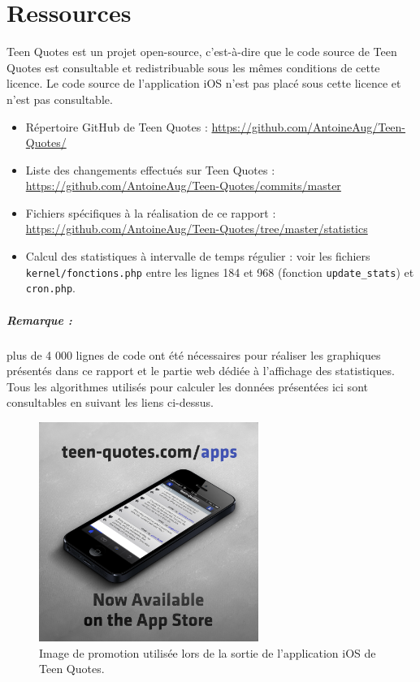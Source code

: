 \documentclass{report}
\begin{document}
	\chapter{Ressources}
	Teen Quotes est un projet open-source, c'est-à-dire que le code source de Teen Quotes est consultable et redistribuable sous les mêmes conditions de cette licence. Le code source de l'application iOS n'est pas placé sous cette licence et n'est pas consultable.\\

	\begin{itemize}
		\item Répertoire GitHub de Teen Quotes : \url{https://github.com/AntoineAug/Teen-Quotes/}
		\item Liste des changements effectués sur Teen Quotes : \url{https://github.com/AntoineAug/Teen-Quotes/commits/master}
		\item Fichiers spécifiques à la réalisation de ce rapport : \url{https://github.com/AntoineAug/Teen-Quotes/tree/master/statistics}
		\item Calcul des statistiques à intervalle de temps régulier : voir les fichiers \texttt{kernel/fonctions.php} entre les lignes 184 et 968 (fonction \texttt{update\_stats}) et \texttt{cron.php}.
	\end{itemize}

	\paragraph{Remarque :} plus de 4 000 lignes de code ont été nécessaires pour réaliser les graphiques présentés dans ce rapport et le partie web dédiée à l'affichage des statistiques. Tous les algorithmes utilisés pour calculer les données présentées ici sont consultables en suivant les liens ci-dessus.

	\begin{figure}[H]
		\center
		\includegraphics[width=270px]{images/promoApp.png}
		\caption{Image de promotion utilisée lors de la sortie de l'application iOS de Teen Quotes.}
	\end{figure}

\end{document}

